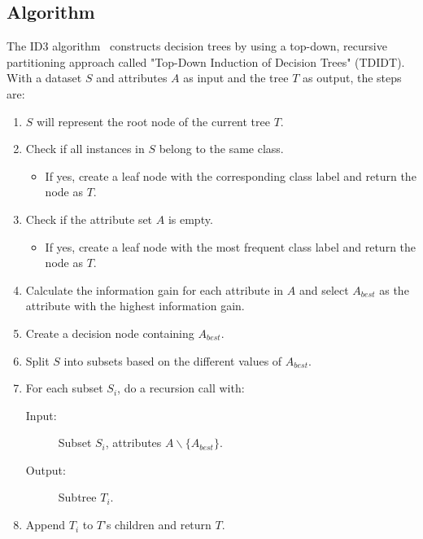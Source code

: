 \subsection{Algorithm}
The ID3 algorithm~\cite{id3_algorithm_wiki} constructs decision trees by using a top-down, recursive partitioning approach called "Top-Down Induction of Decision Trees" (TDIDT). With a dataset $S$ and attributes $A$ as input and the tree $T$ as output, the steps are:

\begin{enumerate}
	\item $S$ will represent the root node of the current tree $T$.
	\item Check if all instances in $S$ belong to the same class.
    \begin{itemize}
        \item If yes, create a leaf node with the corresponding class label and return the node as $T$.
    \end{itemize}
    \item Check if the attribute set $A$ is empty.
    \begin{itemize}
        \item If yes, create a leaf node with the most frequent class label and return the node as $T$.
    \end{itemize}
    \item Calculate the information gain for each attribute in $A$ and select $A_{best}$ as the attribute with the highest information gain.
    \item Create a decision node containing $A_{best}$.
    \item Split $S$ into subsets based on the different values of $A_{best}$.
    \item For each subset $S_i$, do a recursion call with:
    \begin{description}
    	\item[Input:] Subset $S_i$, attributes $A \backslash \{A_{best}\}$.
    	\item[Output:] Subtree $T_i$.
    \end{description}
    \item Append $T_i$ to $T$'s children and return $T$. 
\end{enumerate}
